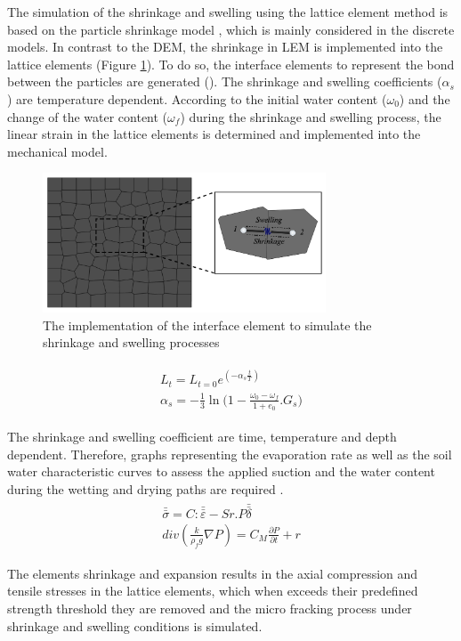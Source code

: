 The simulation of the shrinkage and swelling using the lattice element method is based on the particle shrinkage model \cite{Simaetal2013}, which is mainly considered in the discrete models. In contrast to the DEM, the shrinkage in LEM is implemented into the lattice elements (Figure \ref{fig:Amir_LEM_Shrinkage}). To do so, the interface elements to represent the bond between the particles are generated (\cite{Sattarietal2019b}). The shrinkage and swelling coefficients ($\alpha_s$) are temperature dependent. According to the initial water content ($\omega_0$) and the change of the water content ($\omega_f $) during the shrinkage and swelling process, the linear strain in the lattice elements is determined and implemented into the mechanical model. 

\begin{figure}[!ht]
\centering
\includegraphics[width=0.75\textwidth]{figures/Amir_LEM_Shrinkage.png}
\caption{The implementation of the interface element to simulate the shrinkage and swelling processes}
\label{fig:Amir_LEM_Shrinkage}
\end{figure}

\begin{align}
\label{eq:LEM_Shrinkage_1}
\begin{split}
L_t=L_{t=0}e^{(-\alpha_s\frac{t}{T})}\\
\alpha_s=-\frac{1}{3}\ln{(1-\frac{\omega_0-\omega_f}{1+e_0}}.G_s)
\end{split}
\end{align} 

The shrinkage and swelling coefficient are time, temperature and depth dependent. Therefore, graphs representing the evaporation rate as well as the soil water characteristic curves to assess the applied suction and the water content during the wetting and drying paths are required \cite{Voetal2017}. 
\begin{align}
\label{eq:LEM_Shrinkage_2}
\begin{split}
\bar{\bar{\sigma}}=C:\bar{\bar{\varepsilon}}-Sr.P\bar{\bar{\delta}}\\
div\left(\frac{k}{\rho_fg}\nabla P\right)=C_M\frac{\partial P}{\partial t}+r
\end{split}
\end{align} 

The elements shrinkage and expansion results in the axial compression and tensile stresses in the lattice elements, which when exceeds their predefined strength threshold they are removed and the micro fracking process under shrinkage and swelling conditions is simulated.
